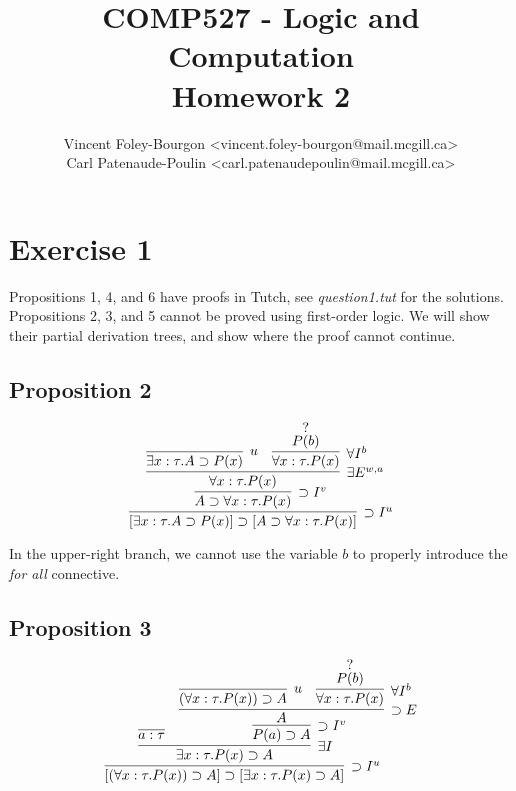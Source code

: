 \documentclass[11pt]{article}
\begin{document}
\title{COMP527 - Logic and Computation \\ Homework 2}
\author{
  Vincent Foley-Bourgon <vincent.foley-bourgon@mail.mcgill.ca> \\
  Carl Patenaude-Poulin <carl.patenaudepoulin@mail.mcgill.ca>
}

\maketitle

\section{Exercise 1}

Propositions 1, 4, and 6 have proofs in Tutch, see {\it question1.tut} for
the solutions.  Propositions 2, 3, and 5 cannot be proved using
first-order logic.  We will show their partial derivation trees, and
show where the proof cannot continue.

\subsection{Proposition 2}

\[
\infer[\supset I^u]
  {[\exists x:\tau. A \supset P(x)] \supset [A \supset \forall x:\tau. P(x)]}
  {
    \infer[\supset I^v]
      {A \supset \forall x:\tau. P(x)}
      {
         \infer[\exists E^{w,a}]
            {\forall x:\tau. P(x)}
            {
              \infer[u]{\exists x:\tau. A \supset P(x)}{} &
              \infer[\forall I^b]
                 {\forall x:\tau. P(x)}
                 {
                    \deduce{P(b)}{?}
                 }
            }
      }
  }
\]



In the upper-right branch, we cannot use the variable $b$ to properly
introduce the {\it for all} connective.



\subsection{Proposition 3}

\[
\infer[\supset I^u]
  {[(\forall x:\tau. P(x)) \supset A] \supset [\exists x:\tau. P(x) \supset A]}
  {
    \infer[\exists I]
      {\exists x:\tau. P(x) \supset A}
      {
        \infer{a:\tau}{} &
        \infer[\supset I^v]
          {P(a) \supset A}
          {
            \infer[\supset E]
              {A}
              {
                \infer[u]{(\forall x:\tau. P(x)) \supset A}{} &
                \infer[\forall I^b]
                  {\forall x:\tau. P(x)}
                  {
                    \deduce{P(b)}{\mathcal{?}}
                  }
              }
          }
      }
  }
\]
\end{document}
